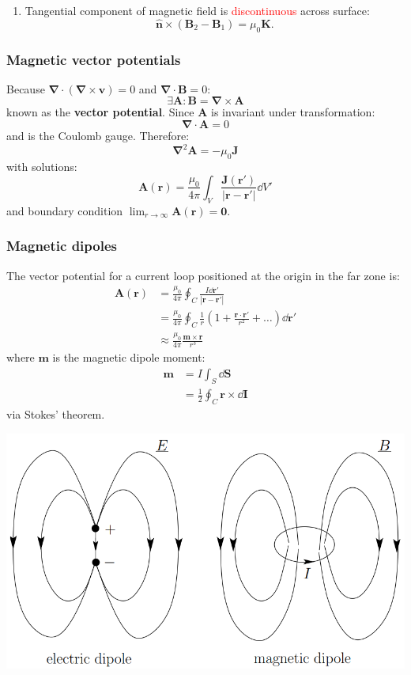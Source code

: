 \documentclass{article}
\newcommand{\vc}[1]{\boldsymbol{#1}}
\begin{document}
\begin{multicols*}{3}
\begin{enumerate}
    \item Tangential component of magnetic field
    is \textcolor{red}{discontinuous} across surface:
    $$\hat{\vc{n}}\times(\vc{B}_2-\vc{B}_1)=\mu_0\vc{K}.$$
\end{enumerate}

\subsubsection*{Magnetic vector potentials}
Because $\vc{\nabla}\cdot(\vc{\nabla}\times\vc{v})=0$
and $\vc{\nabla}\cdot\vc{B}=0$:
$$\exists\vc{A}:\vc{B}=\vc{\nabla}\times\vc{A}$$
known as the \textbf{vector potential}.
Since $\vc{A}$ is invariant under transformation:
$$\vc{\nabla}\cdot\vc{A}=0$$
and is the Coulomb gauge. Therefore:
$$\vc{\nabla}^2\vc{A}=-\mu_0\vc{J}$$
with solutions:
$$\vc{A}(\vc{r})=\frac{\mu_0}{4\pi}\int_V
\frac{\vc{J}(\vc{r}')}{|\vc{r}-\vc{r}'|}\dd V'$$
and boundary condition $\displaystyle\lim_{r\rightarrow\infty}
\vc{A}(\vc{r})=\vc{0}$.

\subsubsection*{Magnetic dipoles}
The vector potential for a current loop positioned
at the origin in the far zone is:
\begin{align*}
    \vc{A}(\vc{r})
    &=\frac{\mu_0}{4\pi}\oint_C
    \frac{I\dd\vc{r}'}{|\vc{r}-\vc{r}'|} \\
    &=\frac{\mu_0}{4\pi}\oint_C\frac{1}{r}\left(1+
    \frac{\vc{r}\cdot\vc{r}'}{r^2}+\dots\right)\dd\vc{r}' \\
    &\approx\frac{\mu_0}{4\pi}\frac{\vc{m}\times\vc{r}}{r^3}
\end{align*}
where $\vc{m}$ is the magnetic dipole moment:
\begin{align*}
    \vc{m}
    &=I\int_S\dd\vc{S} \\
    &=\frac{1}{2}\oint_C\vc{r}\times\dd\vc{I}
\end{align*}
via Stokes' theorem.
\begin{center}
    \includegraphics[scale=0.4]{f9.png}
\end{center}


\end{multicols*}
\end{document}
